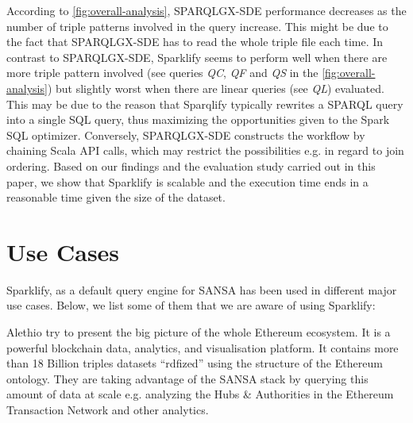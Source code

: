 
According to \autoref{fig:overall-analysis}, SPARQLGX-SDE performance decreases as the number of triple patterns involved in the query increase. %
This might be due to the fact that SPARQLGX-SDE has to read the whole triple file each time.
In contrast to SPARQLGX-SDE, Sparklify seems to perform well when there are more triple pattern involved (see queries \textit{QC}, \textit{QF} and \textit{QS} in the \autoref{fig:overall-analysis}) but slightly worst when there are linear queries (see \textit{QL}) evaluated.
This may be due to the reason that Sparqlify typically rewrites a SPARQL query into a single SQL query, thus maximizing the opportunities given to the Spark SQL optimizer. Conversely, SPARQLGX-SDE constructs the workflow by chaining Scala API calls, which may restrict the possibilities e.g. in regard to join ordering.
Based on our findings and the evaluation study carried out in this paper, we show that Sparklify is scalable and the execution time ends in a reasonable time given the size of the dataset.

\section{Use Cases}
\label{sec:use_cases}

Sparklify, as a default query engine for SANSA has been used in different major use cases.
Below, we list some of them that we are aware of using Sparklify:

 Alethio try to present the big picture of the whole Ethereum ecosystem.
It is a powerful blockchain data, analytics, and visualisation platform.
It contains more than 18 Billion triples datasets ``rdfized'' using the structure of the Ethereum ontology.
They are taking advantage of the SANSA stack by querying this amount of data at scale e.g. analyzing the Hubs \& Authorities in the Ethereum Transaction Network and other analytics.


